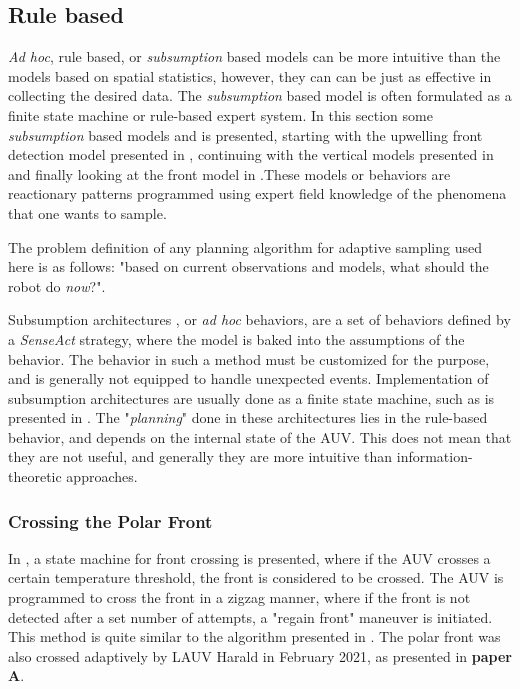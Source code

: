 \subsection{Rule based}
\textit{Ad hoc}, rule based, or \textit{subsumption} based models can be more intuitive than the models based on spatial statistics, however, they can can be just as effective in collecting the desired data. The \textit{subsumption} based model is often formulated as a finite state machine or rule-based expert system. In this section some \textit{subsumption} based models and is presented, starting with the upwelling front detection model presented in \textcite{zhang2012autonomous,zhang2016autonomous}, continuing with the vertical models presented in \textcite{zhang2011peak,zhang2019autonomous} and finally looking at the front model in \textcite{fossum2021adaptive}.These models or behaviors are reactionary patterns programmed using expert field knowledge of the phenomena that one wants to sample. 



The problem definition of any planning algorithm for adaptive sampling used here is as follows: "based on current observations and models, what should the robot do \textit{now}?". 

Subsumption architectures \cite{fossum2019adaptive}, or \textit{ad hoc} behaviors, are a set of behaviors defined by a \textit{Sense\textrightarrow Act} strategy, where the model is baked into the assumptions of the behavior. The behavior in such a method must be customized for the purpose, and is generally not equipped to handle unexpected events. Implementation of subsumption architectures are usually done as a finite state machine, such as is presented in \textcite{fossum2021adaptive}. The "\textit{planning}" done in these architectures lies in the rule-based behavior, and depends on the internal state of the AUV. This does not mean that they are not useful, and generally they are more intuitive than information-theoretic approaches. 

\subsubsection*{Crossing the Polar Front}
In \textcite{fossum2021adaptive}, a state machine for front crossing is presented, where if the AUV crosses a certain temperature threshold, the front is considered to be crossed. The AUV is programmed to cross the front in a zigzag manner, where if the front is not detected after a set number of attempts, a "regain front" maneuver is initiated. This method is quite similar to the algorithm presented in \textcite{zhang2016autonomous}. The polar front was also crossed adaptively by LAUV Harald in February 2021, as presented in \textbf{paper A}. 


